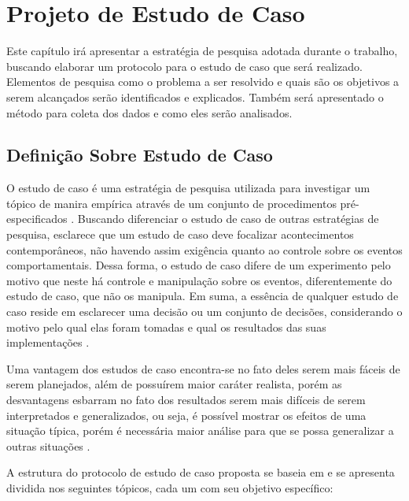 \chapter{Projeto de Estudo de Caso}

Este capítulo irá apresentar a estratégia de pesquisa adotada durante o trabalho, buscando elaborar um protocolo para o estudo de caso que será realizado. Elementos de pesquisa como o problema a ser resolvido e quais são os objetivos a serem alcançados serão identificados e explicados. Também será apresentado o método para coleta dos dados e como eles serão analisados.


\section{Definição Sobre Estudo de Caso}

O estudo de caso é uma estratégia de pesquisa utilizada para investigar um tópico de manira empírica através de um conjunto de procedimentos pré-especificados \cite{yin2001estudo}. Buscando diferenciar o estudo de caso de outras estratégias de pesquisa,  esclarece que um estudo de caso deve focalizar acontecimentos contemporâneos, não havendo assim exigência quanto ao controle sobre os eventos comportamentais. Dessa forma, o estudo de caso difere de um experimento pelo motivo que neste há controle e manipulação sobre os eventos, diferentemente do estudo de caso, que não os manipula. Em suma, a essência de qualquer estudo de caso reside em esclarecer uma decisão ou um conjunto de decisões, considerando o motivo pelo qual elas foram tomadas e qual os resultados das suas implementações \cite{schramm_notes_1971}. 

Uma vantagem dos estudos de caso encontra-se no fato deles serem mais fáceis de serem planejados, além de possuírem maior caráter realista, porém as desvantagens esbarram no fato dos resultados serem mais difíceis de serem interpretados e generalizados, ou seja, é possível mostrar os efeitos de uma situação típica, porém é necessária maior análise para que se possa generalizar a outras situações \cite{wohlin2012experimentation}.


A estrutura do protocolo de estudo de caso proposta se baseia em  e se apresenta dividida nos seguintes tópicos, cada um com seu objetivo específico:

